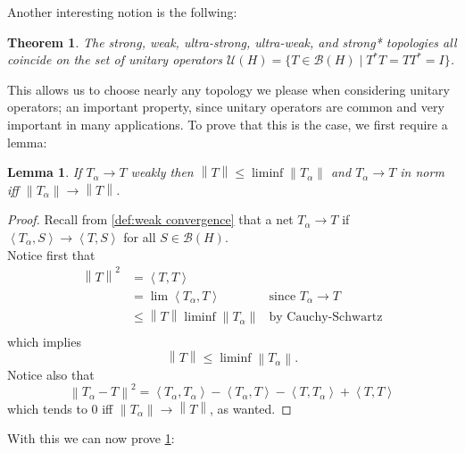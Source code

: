 \documentclass{article}
\theoremstyle{plain}
\newtheorem{theorem}{Theorem}
\newtheorem{lemma}{Lemma}[section]
\theoremstyle{definition}
\newcommand{\inner}[2]{\left\langle #1, #2 \right\rangle}
\newcommand{\norm}[1]{\left\lVert #1 \right\rVert}
\newcommand{\BH}{\cal{B}(H)}
\renewcommand{\cal}[1]{\mathcal{#1}}
\begin{document}
        Another interesting notion is the follwing:
        \begin{theorem} \label{thm:unitary}
                The strong, weak, ultra-strong, ultra-weak, and strong*  topologies all coincide on the set of unitary operators $\cal{U}(H) = \{T \in \BH \mid T^* T = T T^* = I\}$.
        \end{theorem}
        This allows us to choose nearly any topology we please when considering unitary operators; an important property, since unitary operators are common and very important in many applications.
        To prove that this is the case, we first require a lemma:
        \begin{lemma} \label{lemma:net}
                If $T_\alpha \to T$ weakly then $\norm{T} \leq \liminf \norm{T_\alpha}$ and $T_\alpha \to T$ in norm iff $\norm{T_\alpha} \to \norm{T}$.
        \end{lemma}
        \begin{proof}
                Recall from \cref{def:weak convergence} that a net $T_\alpha \to T$ if $\inner{T_\alpha}{S} \to \inner{T}{S}$ for all $S \in \BH$.\\
                Notice first that
                \begin{align*}
                \norm{T}^2 &= \inner{T}{T}\\
                &= \lim \inner{T_\alpha}{T} & \text{since $T_\alpha \to T$}\\
                &\leq \norm{T} \liminf \norm{T_\alpha} & \text{by Cauchy-Schwartz}\\
                \end{align*}
                which implies
                        $$ \norm{T} \leq \liminf \norm{T_\alpha}.$$
                Notice also that 
                $$\norm{T_\alpha - T}^2 = \inner{T_\alpha}{T_\alpha} - \inner{T_\alpha}{T} - \inner{T}{T_\alpha} + \inner{T}{T}$$
                which tends to 0 iff $\norm{T_\alpha} \to \norm{T}$, as wanted.\cite{cycr}
        \end{proof}
        With this we can now prove \cref{thm:unitary}:
\end{document}
